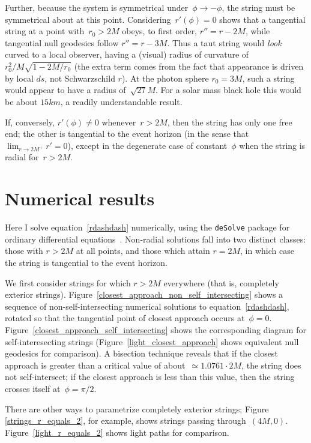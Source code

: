 \documentclass[review]{elsarticle}
\begin{document}
Further, because the system is symmetrical
under~$\phi\longrightarrow-\phi$, the string must be symmetrical about
at this point.  Considering~$r'(\phi)=0$ shows that a tangential
string at a point with~$r_0>2M$ obeys, to first order, $r''=r-2M$,
while tangential null geodesics follow $r''=r-3M$.  Thus a taut string
would {\em look} curved to a local observer, having a (visual) radius
of curvature of $r_0^2/M\sqrt{1-2M/r_0}$ (the extra term comes from
the fact that appearance is driven by local $ds$, not Schwarzschild
$r$).  At the photon sphere $r_0=3M$, such a string would appear to
have a radius of~$\sqrt{27}M$.  For a solar mass black hole this would
be about $15\unit{km}$, a readily understandable result.

If, conversely, $r'(\phi)\neq 0$ whenever~$r>2M$, then the string has
only one free end; the other is tangential to the event horizon (in
the sense that ${\displaystyle \lim_{r\longrightarrow 2M^+}r'=0}$),
except in the degenerate case of constant~$\phi$ when the string is
radial for~$r>2M$.

\section{Numerical results}

Here I solve equation~\ref{rdashdash} numerically, using the
\verb+deSolve+ package for ordinary differential
equations~\cite{soetart2010}.  Non-radial solutions fall into two
distinct classes: those with $r>2M$ at all points, and those which
attain $r=2M$, in which case the string is tangential to the event
horizon.

We first consider strings for which $r>2M$ everywhere (that is,
completely exterior strings).
Figure~\ref{closest_approach_non_self_intersecting} shows a sequence
of non-self-intersecting numerical solutions to
equation~\ref{rdashdash}, rotated so that the tangential point of
closest approach occurs at~$\phi=0$.
Figure~\ref{closest_approach_self_intersecting} shows the
corresponding diagram for self-interesecting strings
(Figure~\ref{light_closest_approach} shows equivalent null geodesics
for comparison).  A bisection technique reveals that if the closest
approach is greater than a critical value of about~$\simeq 1.0761\cdot
2M$, the string does not self-intersect; if the closest approach is
less than this value, then the string crosses itself at~$\phi=\pi/2$.

There are other ways to parametrize completely exterior strings;
Figure \ref{strings_r_equals_2}, for example, shows strings passing
through~$(4M,0)$.  Figure~\ref{light_r_equals_2} shows light paths for
comparison.
\end{document}
